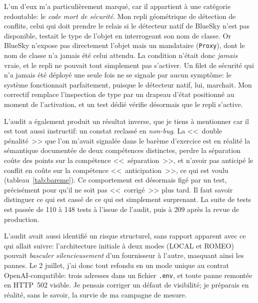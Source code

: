 \documentclass[11pt,a4paper]{article}
\begin{document}
L'un d'eux m'a particulièrement marqué, car il appartient à une catégorie redoutable: le \emph{code mort de sécurité}. Mon repli géométrique de détection de conflits, celui qui doit prendre le relais si le détecteur natif de BlueSky n'est pas disponible, testait le type de l'objet en interrogeant son nom de classe. Or BlueSky n'expose pas directement l'objet mais un mandataire (\texttt{Proxy}), dont le nom de classe n'a jamais été celui attendu. La condition n'était donc \emph{jamais} vraie, et le repli ne pouvait tout simplement pas s'activer. Un filet de sécurité qui n'a jamais été déployé une seule fois ne se signale par aucun symptôme: le système fonctionnait parfaitement, puisque le détecteur natif, lui, marchait. Mon correctif remplace l'inspection de type par un drapeau d'état positionné au moment de l'activation, et un test dédié vérifie désormais que le repli s'active. 

L'audit a également produit un résultat inverse, que je tiens à mentionner car il est tout aussi instructif: un constat reclassé en \emph{non-bug}. La <<~double pénalité~>> que l'on m'avait signalée dans le barème d'exercice est en réalité la sémantique documentée de deux compétences distinctes, perdre la séparation coûte des points sur la compétence <<~séparation~>>, et n'avoir pas anticipé le conflit en coûte sur la compétence <<~anticipation~>>, ce qui est voulu (tableau~\ref{tab:bareme}). Ce comportement est désormais figé par un test, précisément pour qu'il ne soit pas <<~corrigé~>> plus tard. Il faut savoir distinguer ce qui est cassé de ce qui est simplement surprenant. La suite de tests est passée de 110 à 148 tests à l'issue de l'audit, puis à 209 après la revue de production. 

\label{sec:panne-romeo}
L'audit avait aussi identifié un risque structurel, sans rapport apparent avec ce qui allait suivre: l'architecture initiale à deux modes (LOCAL et ROMEO) pouvait \emph{basculer silencieusement} d'un fournisseur à l'autre, masquant ainsi les pannes. Le 2 juillet, j'ai donc tout refondu en un mode unique au contrat OpenAI-compatible: trois adresses dans un fichier \texttt{.env}, et toute panne remontée en HTTP~502 visible. Je pensais corriger un défaut de visibilité; je préparais en réalité, sans le savoir, la survie de ma campagne de mesure.
\end{document}
